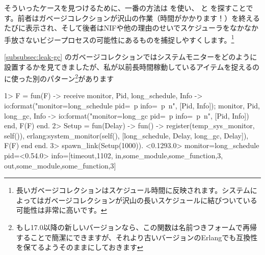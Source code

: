 そういったケースを見つけるために、一番の方法は  を使い、  と  を探すことです。前者はガベージコレクションが沢山の作業（時間がかかります！）を終えるたびに表示され、そして後者はNIFや他の理由のせいでスケジューラをなかなか手放さないビジープロセスの可能性にあるものを捕捉しやすくします。\footnote{長いガベージコレクションはスケジュール時間に反映されます。システムによってはガベージコレクションが沢山の長いスケジュールに結びついている可能性は非常に高いです。}

\ref{subsubsec:leak-gc} のガベージコレクションではシステムモニターをどのように設置するかを見てきましたが、私が以前長時間稼動しているアイテムを捉えるのに使った別のパターン\footnote{もし17.0以降の新しいバージョンなら、この関数は名前つきフォームで再帰することで簡潔にできますが、それより古いバージョンのErlangでも互換性を保てるようそのままにしておきます}があります

\begin{VerbatimEshell}
1> F = fun(F) ->
    receive
        {monitor, Pid, long_schedule, Info} ->
            io:format("monitor=long_schedule pid=~p info=~p~n", [Pid, Info]);
        {monitor, Pid, long_gc, Info} -> 
            io:format("monitor=long_gc pid=~p info=~p~n", [Pid, Info])
    end,
    F(F)
end.
2> Setup = fun(Delay) -> fun() -> 
     register(temp_sys_monitor, self()),
     erlang:system_monitor(self(), [{long_schedule, Delay}, {long_gc, Delay}]),
     F(F)
end end.
3> spawn_link(Setup(1000)).
<0.1293.0>
monitor=long_schedule pid=<0.54.0> info=[{timeout,1102},
                                         {in,{some_module,some_function,3}},
                                         {out,{some_module,some_function,3}}]
\end{VerbatimEshell}

